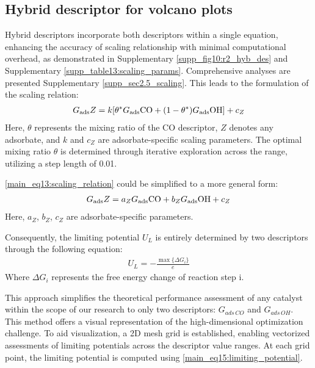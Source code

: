 \subsection{Hybrid descriptor for volcano plots}
Hybrid descriptors incorporate both descriptors within a single equation, enhancing the accuracy of scaling relationship with minimal computational overhead, as demonstrated in Supplementary \cref{supp_fig10:r2_hyb_des} and Supplementary \cref{supp_table13:scaling_params}.
Comprehensive analyses are presented Supplementary \cref{supp_sec2.5_scaling}. This leads to the formulation of the scaling relation:
\begin{align}
G_{\text{ads}} Z =
k[\theta^* G_{\text{ads}} \ce{CO} + (1-\theta^*) G_{\text{ads}} \ce{OH}] + c_Z  \label{main_eq13:scaling_relation}
\end{align}
Here, $\theta$ represents the mixing ratio of the CO descriptor, $\textit{Z}$ denotes any adsorbate, and $\textit{k}$ and $\textit{c}_{Z}$ are adsorbate-specific scaling parameters.
The optimal mixing ratio $\theta$ is determined through iterative exploration across the range, utilizing a step length of 0.01.

\ref{main_eq13:scaling_relation} could be simplified to a more general form:
\begin{align}
G_{\text{ads}} Z =
a_Z G_{\text{ads}} \ce{CO} + b_Z G_{\text{ads}} \ce{OH} + c_Z  \label{main_eq14:general_scaling_relation}
\end{align}
Here, $a_Z$, $b_Z$, $c_Z$ are adsorbate-specific parameters.

Consequently, the limiting potential $\textit{U}_{L}$ is entirely determined by two descriptors through the following equation:
\begin{align}
U_L = -\frac{\max\{ \Delta G_i \}}{e}  \label{main_eq15:limiting_potential}
\end{align}
Where $\Delta G_{i}$ represents the free energy change of reaction step i.

This approach simplifies the theoretical performance assessment of any catalyst within the scope of our research to only two descriptors: $G_{\textit{ads} \, \textit{CO}}$ and $G_{\textit{ads} \, \textit{OH}}$.
This method offers a visual representation of the high-dimensional optimization challenge.
To aid visualization, a 2D mesh grid is established, enabling vectorized assessments of limiting potentials across the descriptor value ranges.
At each grid point, the limiting potential is computed using \cref{main_eq15:limiting_potential}.

